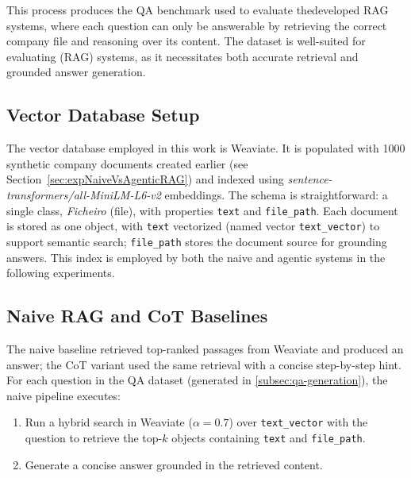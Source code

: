This process produces the \gls{QA} benchmark used to evaluate thedeveloped \gls{RAG} systems, where each question can only be answerable by retrieving the correct company file and reasoning over its content. The dataset is well-suited for evaluating (\gls{RAG}) systems, as it necessitates both accurate retrieval and grounded answer generation.

\subsection{Vector Database Setup}
The vector database employed in this work is Weaviate. It is populated with 1000 synthetic company documents created earlier (see Section~\ref{sec:expNaiveVsAgenticRAG}) and indexed using \textit{sentence-transformers/all-MiniLM-L6-v2} embeddings. The schema is straightforward: a single class, \textit{Ficheiro} (file), with properties \texttt{text} and \texttt{file\_path}. Each document is stored as one object, with \texttt{text} vectorized (named vector \texttt{text\_vector}) to support semantic search; \texttt{file\_path} stores the document source for grounding answers. This index is employed by both the naive and agentic systems in the following experiments.

\subsection{Naive RAG and CoT Baselines}
\label{sec:naive-rag-and-cot-baseline}
The naive baseline retrieved top-ranked passages from Weaviate and produced an answer; the CoT variant used the same retrieval with a concise step-by-step hint.
For each question in the \gls{QA} dataset (generated in \ref{subsec:qa-generation}), the naive pipeline executes:
\begin{enumerate}
    \item Run a hybrid search in Weaviate (\(\alpha = 0.7\)) over \texttt{text\_vector} with the question to retrieve the top-$k$ objects containing \texttt{text} and \texttt{file\_path}.
    \item Generate a concise answer grounded in the retrieved content.
\end{enumerate}

